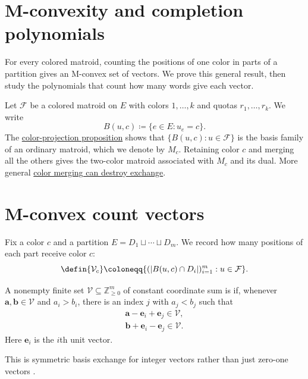 
\section[rank]{M-convexity and completion polynomials}

For every colored matroid, counting the positions of one color in parts
of a partition gives an M-convex set of vectors. We prove this general
result, then study the polynomials that count how many words give each
vector.

Let $\mathcal F$ be a colored matroid on $E$ with colors $1,\dotsc,k$ and
quotas $r_1,\dotsc,r_k$. We write
\[
 B(u,c)\coloneqq\{e\in E:u_e=c\}.
\]
The \href{intro.htm}{color-projection proposition} shows that
$\{B(u,c):u\in\mathcal F\}$ is the basis family of an ordinary matroid,
which we denote by $M_c$.
\label{mergingColors}
Retaining color $c$ and merging all the others gives the two-color
matroid associated with $M_c$ and its dual. More general
\href{operations.htm#colorMerging}{color merging can destroy exchange}.

\section[mConvexCounts]{M-convex count vectors}

Fix a color $c$ and a partition $E=D_1\sqcup\dotsb\sqcup D_m$.
We record how many positions of each part receive color $c$:
\[
 \defin{\mathcal V_c}\coloneqq
 \{(|B(u,c)\cap D_i|)_{i=1}^m:u\in\mathcal F\}.
\]

\begin{definition}[M-convexity]
A nonempty finite set $\mathcal V\subseteq\mathbb Z_{\geq0}^m$ of
constant coordinate sum is  if, whenever
$\mathbf a,\mathbf b\in\mathcal V$ and $a_i>b_i$, there is an index $j$
with $a_j<b_j$ such that
\[
 \begin{gathered}
 \mathbf a-\mathbf e_i+\mathbf e_j\in\mathcal V,\\
 \mathbf b+\mathbf e_i-\mathbf e_j\in\mathcal V.
 \end{gathered}
\]
Here $\mathbf e_i$ is the $i$th unit vector.
\end{definition}

This is symmetric basis exchange for integer vectors rather than just
zero-one vectors \cite{Murota2003}.

